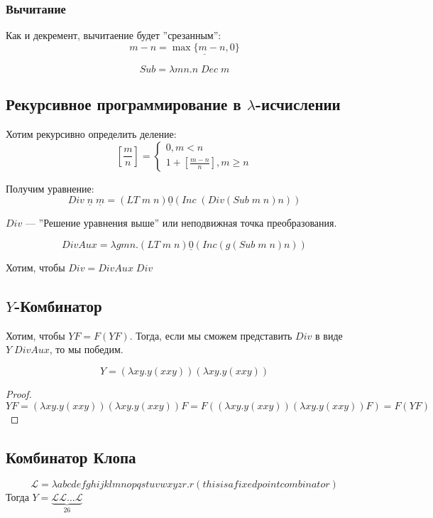 \subsubsection{Вычитание}
Как и декремент, вычитаение будет ''срезанным'':
\[m - n = \underline{\max\{m - n, 0\}}\]
\begin{definition}
    \[Sub = \lambda mn.n\;Dec\;m\]
\end{definition}

\subsection{Рекурсивное программирование в \(\lambda\)-исчислении}
Хотим рекурсивно определить деление:
\[\left[\frac{m}{n}\right] = \left\{\begin{array}{l}
    0, m < n \\
    1 + \left[\frac{m - n}{n}\right], m \ge n
\end{array}\right.\]

Получим уравнение:
\[Div\;\underline{n}\;\underline{m} = (LT\;m\;n)\underline{0}(Inc\;(Div(Sub\;m\;n)n))\]

\(Div\) --- ''Решение уравнения выше'' или неподвижная точка преобразования.

\begin{definition}
    \[DivAux = \lambda gmn.(LT\;m\;n)\underline{0}(Inc(g(Sub\;m\;n)n))\]
\end{definition}
Хотим, чтобы \(Div = DivAux\;Div\)

\subsection{\(Y\)-Комбинатор}
Хотим, чтобы \(YF = F(YF)\). Тогда, если мы сможем представить \(Div\) в виде \(Y\;DivAux\), то мы победим.

\begin{definition}
    \[Y = (\lambda xy.y(xxy))(\lambda xy.y(xxy))\]
\end{definition}
\begin{proof}
    \[YF = (\lambda xy.y(xxy))(\lambda xy.y(xxy))F = F((\lambda xy.y(xxy))(\lambda xy.y(xxy))F) = F(YF)\]
\end{proof}

\subsection{Комбинатор Клопа}
\[\mathcal{L} = \lambda abcdefghijklmnopqstuvwxyzr.r(thisisafixedpointcombinator)\]
Тогда \(Y = \underbrace{\mathcal{L}\mathcal{L}\dots\mathcal{L}}_{26}\)